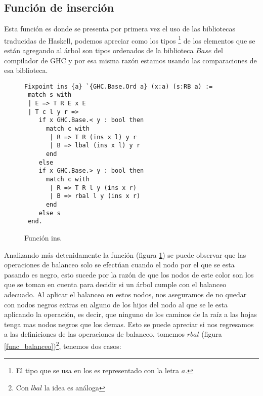 \subsection {Funci\'on de inserci\'on}
Esta funci\'on es donde se presenta por primera vez el uso de las bibliotecas traducidas de
Haskell, podemos apreciar como los tipos \footnote{El tipo que se usa en los \arns es representado
con la letra $a$.} de los elementos que se est\'an agregando al \'arbol son tipos ordenados de la
biblioteca $Base$ del compilador de GHC y por esa misma raz\'on estamos usando las comparaciones de
esa biblioteca.
\begin{figure}
\centering
\captionsetup{justification=centering}
\begin{verbatim}
Fixpoint ins {a} `{GHC.Base.Ord a} (x:a) (s:RB a) :=
 match s with
 | E => T R E x E
 | T c l y r =>
    if x GHC.Base.< y : bool then
      match c with
       | R => T R (ins x l) y r
       | B => lbal (ins x l) y r
      end
    else
    if x GHC.Base.> y : bool then
      match c with
       | R => T R l y (ins x r)
       | B => rbal l y (ins x r)
      end
    else s
 end.
\end{verbatim}
\caption{Funci\'on ins.}
\label{func_ins}
\end{figure}

Analizando m\'as detenidamente la funci\'on (figura \ref{func_ins}) se puede observar que las
operaciones de balanceo solo se efectúan cuando el nodo por el que se esta pasando es negro, esto
sucede por la raz\'on de que los nodos de este color son los que se toman en cuenta para decidir si
un \'arbol cumple con el balanceo adecuado. Al aplicar el balanceo en estos nodos, nos aseguramos
de no quedar con nodos negros extras en alguno de los hijos del nodo al que se le esta aplicando la
operación, es decir, que ninguno de los caminos de la ra\'iz a las hojas tenga mas nodos negros que
los demas. Esto se puede apreciar si nos regresamos a las definiciones de las operaciones de
balanceo, tomemos $rbal$ (figura \ref{func_balanceo})\footnote{Con $lbal$ la idea es an\'aloga}, 
tenemos dos casos:

